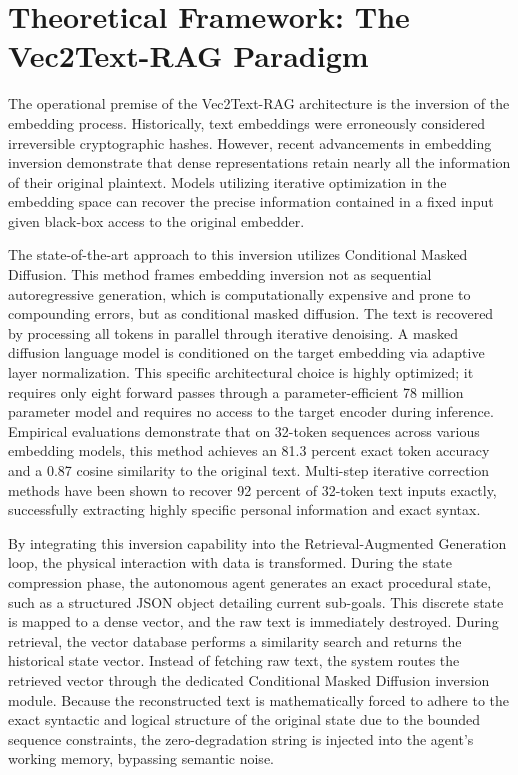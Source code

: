 \documentclass[12pt]{article}
\begin{document}
\section{Theoretical Framework: The Vec2Text-RAG Paradigm}

The operational premise of the Vec2Text-RAG architecture is the inversion of the embedding process. Historically, text embeddings were erroneously considered irreversible cryptographic hashes. However, recent advancements in embedding inversion demonstrate that dense representations retain nearly all the information of their original plaintext. Models utilizing iterative optimization in the embedding space can recover the precise information contained in a fixed input given black-box access to the original embedder.

The state-of-the-art approach to this inversion utilizes Conditional Masked Diffusion. This method frames embedding inversion not as sequential autoregressive generation, which is computationally expensive and prone to compounding errors, but as conditional masked diffusion. The text is recovered by processing all tokens in parallel through iterative denoising. A masked diffusion language model is conditioned on the target embedding via adaptive layer normalization. This specific architectural choice is highly optimized; it requires only eight forward passes through a parameter-efficient 78 million parameter model and requires no access to the target encoder during inference. Empirical evaluations demonstrate that on 32-token sequences across various embedding models, this method achieves an 81.3 percent exact token accuracy and a 0.87 cosine similarity to the original text. Multi-step iterative correction methods have been shown to recover 92 percent of 32-token text inputs exactly, successfully extracting highly specific personal information and exact syntax.

By integrating this inversion capability into the Retrieval-Augmented Generation loop, the physical interaction with data is transformed. During the state compression phase, the autonomous agent generates an exact procedural state, such as a structured JSON object detailing current sub-goals. This discrete state is mapped to a dense vector, and the raw text is immediately destroyed. During retrieval, the vector database performs a similarity search and returns the historical state vector. Instead of fetching raw text, the system routes the retrieved vector through the dedicated Conditional Masked Diffusion inversion module. Because the reconstructed text is mathematically forced to adhere to the exact syntactic and logical structure of the original state due to the bounded sequence constraints, the zero-degradation string is injected into the agent's working memory, bypassing semantic noise.
\end{document}
